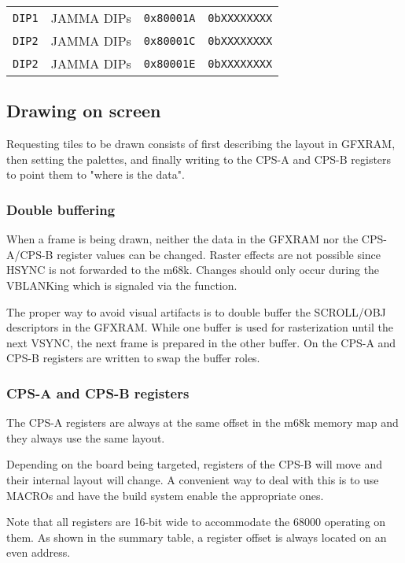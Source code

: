 \begin{tabularx}{\textwidth}{Xllr}
    \toprule   
    \texttt{DIP1} & JAMMA DIPs &  \texttt{0x80001A}    &  \texttt{0bXXXXXXXX}    \\      
    \texttt{DIP2} & JAMMA DIPs &  \texttt{0x80001C}    &  \texttt{0bXXXXXXXX}    \\      
    \texttt{DIP2} & JAMMA DIPs &  \texttt{0x80001E}    &  \texttt{0bXXXXXXXX}    \\      
  \toprule   
\end{tabularx}

\subsection{Drawing on screen}
Requesting tiles to be drawn consists of first describing the layout in GFXRAM, then setting the palettes, and finally writing to the CPS-A and CPS-B registers to point them to "where is the data".

\subsubsection{Double buffering}
When a frame is being drawn, neither the data in the GFXRAM nor the CPS-A/CPS-B register values can be changed. Raster effects are not possible since HSYNC is not forwarded to the m68k. Changes should only occur during the VBLANKing which is signaled via the  function.

The proper way to avoid visual artifacts is to double buffer the SCROLL/OBJ descriptors in the GFXRAM. While one buffer is used for rasterization until the next VSYNC, the next frame is prepared in the other buffer. On  the CPS-A and CPS-B registers are written to swap the buffer roles.

\subsubsection{CPS-A and CPS-B registers}
The CPS-A registers are always at the same offset in the m68k memory map and they always use the same layout. 

Depending on the board being targeted, registers of the CPS-B will move and their internal layout will change. A convenient way to deal with this is to use MACROs and have the build system enable the appropriate ones.

Note that all registers are 16-bit wide to accommodate the 68000 operating on them. As shown in the summary table, a register offset is always located on an even address.

